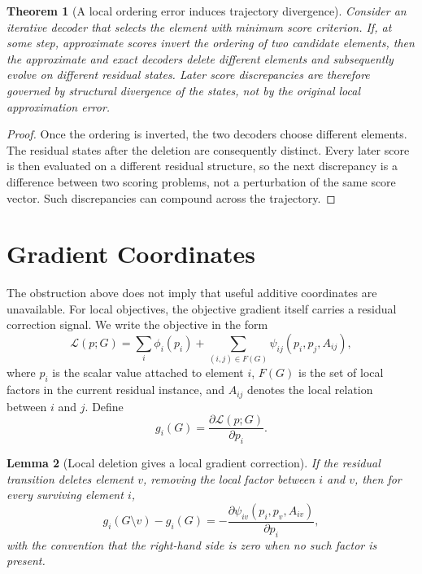 \documentclass[11pt]{article}
\theoremstyle{plain}
\newtheorem{theorem}{Theorem}[section]
\newtheorem{lemma}[theorem]{Lemma}
\theoremstyle{remark}
\begin{document}
\begin{theorem}[A local ordering error induces trajectory divergence]
  \label{thm:cascade}
  Consider an iterative decoder that selects the element with minimum score
  criterion. If, at some step, approximate scores invert the ordering of two
  candidate elements, then the approximate and exact decoders delete different
  elements and subsequently evolve on different residual states. Later score
  discrepancies are therefore governed by structural divergence of the states,
  not by the original local approximation error.
\end{theorem}

\begin{proof}
  Once the ordering is inverted, the two decoders choose different elements. The
  residual states after the deletion are consequently distinct. Every later
  score is then evaluated on a different residual structure, so the next
  discrepancy is a difference between two scoring problems, not a perturbation
  of the same score vector. Such discrepancies can compound across the
  trajectory.
\end{proof}

\section{Gradient Coordinates}

The obstruction above does not imply that useful additive coordinates are
unavailable.  For local objectives, the objective gradient itself carries a
residual correction signal.  We write the objective in the form
\[
  \mathcal{L}(p;G)
  =
  \sum_i \phi_i(p_i)
  +
  \sum_{(i,j)\in F(G)} \psi_{ij}(p_i,p_j,A_{ij}),
\]
where $p_i$ is the scalar value attached to element $i$, $F(G)$ is the set of
local factors in the current residual instance, and $A_{ij}$ denotes the local
relation between $i$ and $j$.  Define
\[
  g_i(G)=\frac{\partial \mathcal{L}(p;G)}{\partial p_i}.
\]

\begin{lemma}[Local deletion gives a local gradient correction]
  \label{lem:local_gradient_correction}
  If the residual transition deletes element $v$, removing the local factor
  between $i$ and $v$, then for every surviving element $i$,
  \[
    g_i(G\setminus v)-g_i(G)
    =
    -\frac{\partial \psi_{iv}(p_i,p_v,A_{iv})}{\partial p_i},
  \]
  with the convention that the right-hand side is zero when no such factor is
  present.
\end{lemma}
\end{document}
